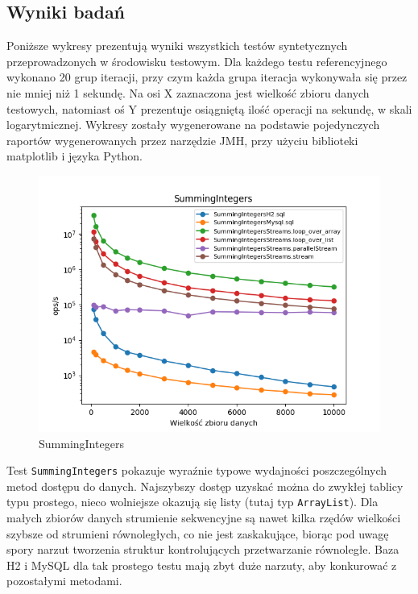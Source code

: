 \documentclass[12pt,twoside,openright]{extarticle}
\begin{document}
\newpage

\subsection{Wyniki badań}

    Poniższe wykresy prezentują wyniki wszystkich testów syntetycznych przeprowadzonych w środowisku testowym. Dla każdego testu referencyjnego wykonano 20 grup iteracji, przy czym każda grupa iteracja wykonywała się przez nie mniej niż 1 sekundę. Na osi X zaznaczona jest wielkość zbioru danych testowych, natomiast oś Y prezentuje osiągniętą ilość operacji na sekundę, w skali logarytmicznej. Wykresy zostały wygenerowane na podstawie pojedynczych raportów wygenerowanych przez narzędzie JMH, przy użyciu biblioteki matplotlib \cite{matplotlib} i języka Python.

\begin{figure}[H]
\centering
\includegraphics[width=15cm]{plots/SummingIntegers}
\caption{SummingIntegers}
\end{figure}

    Test \texttt{SummingIntegers} pokazuje wyraźnie typowe wydajności poszczególnych metod dostępu do danych. Najszybszy dostęp uzyskać można do zwykłej tablicy typu prostego, nieco wolniejsze okazują się listy (tutaj typ \texttt{ArrayList}). Dla małych zbiorów danych strumienie sekwencyjne są nawet kilka rzędów wielkości szybsze od strumieni równoległych, co nie jest zaskakujące, biorąc pod uwagę spory narzut tworzenia struktur kontrolujących przetwarzanie równoległe. Baza H2 i MySQL dla tak prostego testu mają zbyt duże narzuty, aby konkurować z pozostałymi metodami.
\end{document}

